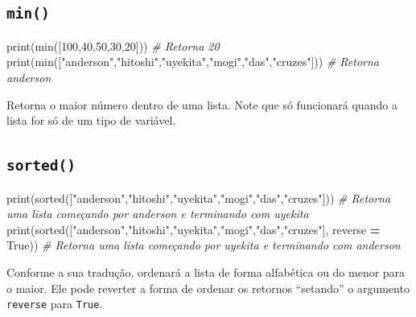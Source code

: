 \documentclass[]{book}
\newenvironment{Shaded}{\begin{snugshade}}{\end{snugshade}}
\newcommand{\DecValTok}[1]{\textcolor[rgb]{0.00,0.00,0.81}{#1}}
\newcommand{\StringTok}[1]{\textcolor[rgb]{0.31,0.60,0.02}{#1}}
\newcommand{\CommentTok}[1]{\textcolor[rgb]{0.56,0.35,0.01}{\textit{#1}}}
\newcommand{\VariableTok}[1]{\textcolor[rgb]{0.00,0.00,0.00}{#1}}
\newcommand{\OperatorTok}[1]{\textcolor[rgb]{0.81,0.36,0.00}{\textbf{#1}}}
\newcommand{\BuiltInTok}[1]{#1}
\newcommand{\NormalTok}[1]{#1}
\begin{document}
\subsection{\texorpdfstring{\texttt{min()}}{min()}}\label{min}

\begin{Shaded}
\begin{Highlighting}[]
\BuiltInTok{print}\NormalTok{(}\BuiltInTok{min}\NormalTok{([}\DecValTok{100}\NormalTok{,}\DecValTok{40}\NormalTok{,}\DecValTok{50}\NormalTok{,}\DecValTok{30}\NormalTok{,}\DecValTok{20}\NormalTok{]))                                       }\CommentTok{# Retorna 20}
\BuiltInTok{print}\NormalTok{(}\BuiltInTok{min}\NormalTok{([}\StringTok{"anderson"}\NormalTok{,}\StringTok{"hitoshi"}\NormalTok{,}\StringTok{"uyekita"}\NormalTok{,}\StringTok{"mogi"}\NormalTok{,}\StringTok{"das"}\NormalTok{,}\StringTok{"cruzes"}\NormalTok{]))  }\CommentTok{# Retorna anderson}
\end{Highlighting}
\end{Shaded}

Retorna o maior número dentro de uma lista. Note que só funcionará
quando a lista for só de um tipo de variável.

\subsection{\texorpdfstring{\texttt{sorted()}}{sorted()}}\label{sorted}

\begin{Shaded}
\begin{Highlighting}[]
\BuiltInTok{print}\NormalTok{(}\BuiltInTok{sorted}\NormalTok{([}\StringTok{"anderson"}\NormalTok{,}\StringTok{"hitoshi"}\NormalTok{,}\StringTok{"uyekita"}\NormalTok{,}\StringTok{"mogi"}\NormalTok{,}\StringTok{"das"}\NormalTok{,}\StringTok{"cruzes"}\NormalTok{]))                  }\CommentTok{# Retorna uma lista começando por anderson e terminando com uyekita}
\BuiltInTok{print}\NormalTok{(}\BuiltInTok{sorted}\NormalTok{([}\StringTok{"anderson"}\NormalTok{,}\StringTok{"hitoshi"}\NormalTok{,}\StringTok{"uyekita"}\NormalTok{,}\StringTok{"mogi"}\NormalTok{,}\StringTok{"das"}\NormalTok{,}\StringTok{"cruzes"}\NormalTok{], reverse }\OperatorTok{=} \VariableTok{True}\NormalTok{))  }\CommentTok{# Retorna uma lista começando por uyekita e terminando com anderson}
\end{Highlighting}
\end{Shaded}

Conforme a sua tradução, ordenará a lista de forma alfabética ou do
menor para o maior. Ele pode reverter a forma de ordenar os retornos
``setando'' o argumento \texttt{reverse} para \texttt{True}.
\end{document}
